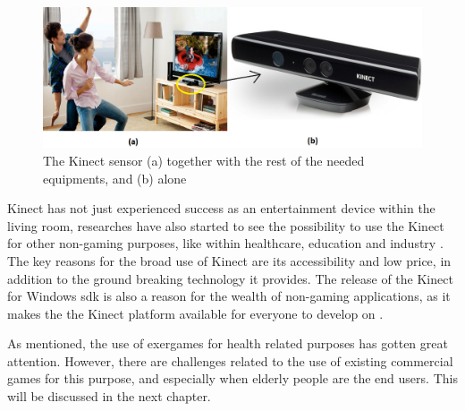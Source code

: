 \begin{figure} 
\centering
\includegraphics[scale=0.36]{sensorandtv}
\caption[The Kinect sensor]{The Kinect sensor (a) together with the rest of the needed equipments, and (b) alone}
\label{kinectsensor}
\end{figure} 
 
Kinect has not just experienced success as an entertainment device within the living room, researches have also started to see the possibility to use the Kinect for other non-gaming purposes, like within healthcare, education and industry \cite{microsoftnews}. The key reasons for the broad use of Kinect are its accessibility and low price, in addition to the ground breaking technology it provides. The release of the Kinect for Windows \ac{sdk} is also a reason for the wealth of non-gaming applications, as it makes the the Kinect platform available for everyone to develop on \cite{microsoftnews}. 

As mentioned, the use of exergames for health related purposes has gotten great attention. However, there are challenges related to the use of existing commercial games for this purpose, and especially when elderly people are the end users. This will be discussed in the next chapter. 
